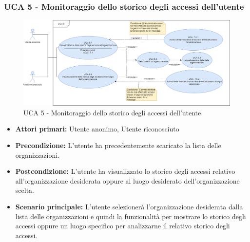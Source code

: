 \subsubsection{UCA 5 - Monitoraggio dello storico degli accessi dell'utente}
\begin{figure}[h]
	\centering	
	\includegraphics[scale=0.5]{sezioni/UseCase/Immagini/UCA5.png}
	\caption{UCA 5 - Monitoraggio dello storico degli accessi dell'utente}
\end{figure}

\begin{itemize}
    \item \textbf{Attori primari:} Utente anonimo, Utente riconosciuto
    \item \textbf{Precondizione:} L'utente ha precedentemente scaricato la lista delle organizzazioni.
    \item \textbf{Postcondizione:} L'utente ha visualizzato lo storico degli accessi relativo all'organizzazione desiderata oppure al luogo desiderato dell'organizzazione scelta.
    \item \textbf{Scenario principale:} L'utente selezionerà l'organizzazione desiderata dalla lista delle organizzazioni e quindi la funzionalità per mostrare lo storico degli accessi oppure un luogo specifico per analizzarne il relativo storico degli accessi.
\end{itemize}

